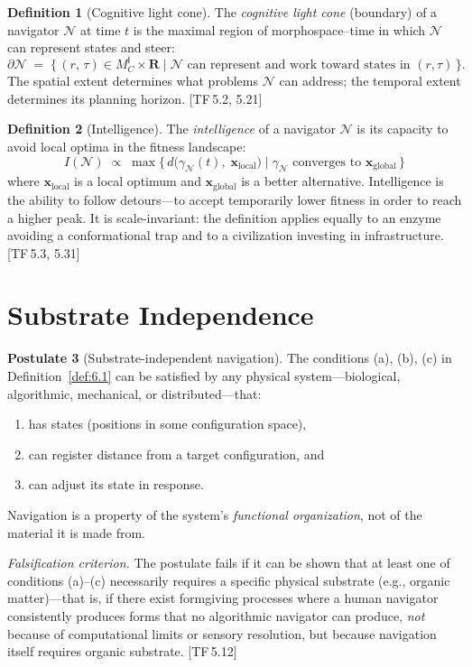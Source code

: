 \documentclass[11pt, a4paper]{article}
\theoremstyle{definition}
\newtheorem{definition}{Definition}[section]
\newtheorem{postulate}[definition]{Postulate}
\theoremstyle{plain}
\theoremstyle{remark}
\newcommand{\MC}{M^{\mathsf{I}}_C}          %
\providecommand{\R}{}
\renewcommand{\R}{\mathbf{R}}               %
\newcommand{\Nav}{\mathcal{N}}               %
\newcommand{\TF}[1]{\textnormal{[TF\,#1]}}  %
\begin{document}
\begin{definition}[Cognitive light cone]\label{def:6.2}
The \emph{cognitive light cone} (boundary) of a navigator $\Nav$ at
time $t$ is the maximal region of morphospace--time in which $\Nav$ can
represent states and steer:
\[
  \partial\Nav \;=\;
  \bigl\{\, (r,\, \tau) \in \MC \times \R
    \;\big|\;
    \Nav \text{ can represent and work toward states in } (r, \tau)
  \,\bigr\}.
\]
The spatial extent determines what problems $\Nav$ can address; the
temporal extent determines its planning horizon. \TF{5.2, 5.21}
\end{definition}

\begin{definition}[Intelligence]\label{def:6.3}
The \emph{intelligence} of a navigator $\Nav$ is its capacity to avoid
local optima in the fitness landscape:
\[
  I(\Nav) \;\propto\;
  \max\bigl\{\, d\bigl(\gamma_\Nav(t),\; \bm{x}_{\mathrm{local}}\bigr)
    \;\big|\;
    \gamma_\Nav \text{ converges to } \bm{x}_{\mathrm{global}}
  \,\bigr\}
\]
where $\bm{x}_{\mathrm{local}}$ is a local optimum and
$\bm{x}_{\mathrm{global}}$ is a better alternative.
Intelligence is the ability to follow detours---to accept temporarily
lower fitness in order to reach a higher peak. It is scale-invariant:
the definition applies equally to an enzyme avoiding a conformational
trap and to a civilization investing in infrastructure. \TF{5.3, 5.31}
\end{definition}


\newpage
\section{Substrate Independence}\label{sec:substrate}

\begin{postulate}[Substrate-independent navigation]\label{post:7.1}
The conditions (a), (b), (c) in Definition~\ref{def:6.1} can be
satisfied by any physical system---biological, algorithmic, mechanical,
or distributed---that:
\begin{enumerate}[label=(\roman*),nosep]
  \item has states (positions in some configuration space),
  \item can register distance from a target configuration, and
  \item can adjust its state in response.
\end{enumerate}
Navigation is a property of the system's \emph{functional organization},
not of the material it is made from.

\medskip\noindent
\textit{Falsification criterion.}
The postulate fails if it can be shown that at least one of conditions
(a)--(c) necessarily requires a specific physical substrate (e.g.,
organic matter)---that is, if there exist formgiving processes where a
human navigator consistently produces forms that no algorithmic navigator
can produce, \emph{not} because of computational limits or sensory
resolution, but because navigation itself requires organic substrate.
\TF{5.12}
\end{postulate}
\end{document}
